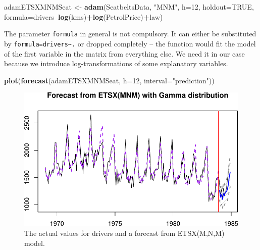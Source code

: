 \documentclass[]{book}
\newenvironment{Shaded}{\begin{snugshade}}{\end{snugshade}}
\newcommand{\DataTypeTok}[1]{\textcolor[rgb]{0.13,0.29,0.53}{#1}}
\newcommand{\DecValTok}[1]{\textcolor[rgb]{0.00,0.00,0.81}{#1}}
\newcommand{\KeywordTok}[1]{\textcolor[rgb]{0.13,0.29,0.53}{\textbf{#1}}}
\newcommand{\NormalTok}[1]{#1}
\newcommand{\OperatorTok}[1]{\textcolor[rgb]{0.81,0.36,0.00}{\textbf{#1}}}
\newcommand{\OtherTok}[1]{\textcolor[rgb]{0.56,0.35,0.01}{#1}}
\newcommand{\StringTok}[1]{\textcolor[rgb]{0.31,0.60,0.02}{#1}}
\theoremstyle{definition}
\theoremstyle{definition}
\theoremstyle{definition}
\theoremstyle{definition}
\theoremstyle{remark}
\begin{document}
\begin{Shaded}
\begin{Highlighting}[]
\NormalTok{adamETSXMNMSeat <-}\StringTok{ }\KeywordTok{adam}\NormalTok{(SeatbeltsData, }\StringTok{"MNM"}\NormalTok{, }\DataTypeTok{h=}\DecValTok{12}\NormalTok{, }\DataTypeTok{holdout=}\OtherTok{TRUE}\NormalTok{,}
                        \DataTypeTok{formula=}\NormalTok{drivers}\OperatorTok{~}\KeywordTok{log}\NormalTok{(kms)}\OperatorTok{+}\KeywordTok{log}\NormalTok{(PetrolPrice)}\OperatorTok{+}\NormalTok{law)}
\end{Highlighting}
\end{Shaded}

The parameter \texttt{formula} in general is not compulsory. It can either be substituted by \texttt{formula=drivers\textasciitilde{}.} or dropped completely -- the function would fit the model of the first variable in the matrix from everything else. We need it in our case because we introduce log-transformations of some explanatory variables.

\begin{Shaded}
\begin{Highlighting}[]
\KeywordTok{plot}\NormalTok{(}\KeywordTok{forecast}\NormalTok{(adamETSXMNMSeat, }\DataTypeTok{h=}\DecValTok{12}\NormalTok{, }\DataTypeTok{interval=}\StringTok{"prediction"}\NormalTok{))}
\end{Highlighting}
\end{Shaded}

\begin{figure}
\centering
\includegraphics{Svetunkov--2022----ADAM_files/figure-latex/SeatbeltsForecastX-1.pdf}
\caption{\label{fig:SeatbeltsForecastX}The actual values for drivers and a forecast from ETSX(M,N,M) model.}
\end{figure}
\end{document}
